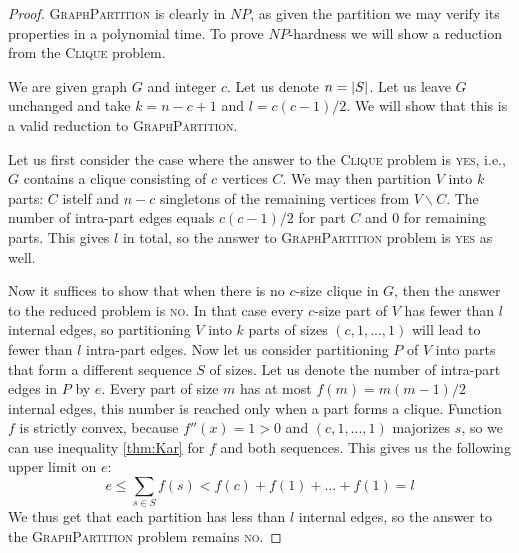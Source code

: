 \begin{proof}
\textsc{GraphPartition} is clearly in $NP$,
as given the partition we may verify its properties in a polynomial time.
To prove $NP$-hardness we will show a reduction from the \textsc{Clique} problem.

We are given graph $G$ and integer $c$.
Let us denote $n = \left\vert S \right\vert$.
Let us leave $G$ unchanged and take $k = n-c+1$ and $l = c(c-1)/2$.
We will show that this is a valid reduction to \textsc{GraphPartition}.

Let us first consider the case where the answer to the \textsc{Clique} problem is \textsc{yes},
i.e., $G$ contains a clique consisting of $c$ vertices $C$.
We may then partition $V$ into $k$ parts:
$C$ istelf and $n-c$ singletons of the remaining vertices from $V \backslash C$.
The number of intra-part edges equals $c(c-1)/2$ for part $C$ and $0$ for remaining parts.
This gives $l$ in total, so the answer to \textsc{GraphPartition} problem is \textsc{yes} as well.

Now it suffices to show that when there is no $c$-size clique in $G$,
then the answer to the reduced problem is \textsc{no}.
In that case every $c$-size part of $V$ has fewer than $l$ internal edges,
so partitioning $V$ into $k$ parts of sizes $(c, 1, ..., 1)$ will lead to fewer than $l$ intra-part edges.
Now let us consider partitioning $P$ of $V$ into parts that form a different sequence $S$ of sizes.
Let us denote the number of intra-part edges in $P$ by $e$.
Every part of size $m$ has at most $f(m) = m(m-1)/2$ internal edges,
this number is reached only when a part forms a clique.
Function $f$ is strictly convex, because $f''(x) = 1 > 0$ and $(c,1,...,1)$ majorizes $s$,
so we can use inequality \eqref{thm:Kar} for $f$ and both sequences.
This gives us the following upper limit on $e$:
$$e \leq \sum_{s\in{S}} f(s) < f(c) + f(1) + ... + f(1) = l$$
We thus get that each partition has less than $l$ internal edges,
so the answer to the \textsc{GraphPartition} problem remains \textsc{no}.
\end{proof}
